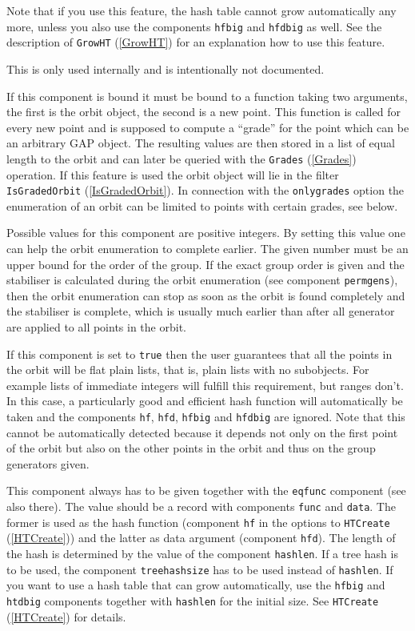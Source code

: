 \documentclass[a4paper,11pt]{report}
\begin{document}
{{{\begin{description}
 Note that if you use this feature, the hash table cannot grow automatically
any more, unless you also use the components \texttt{hfbig} and \texttt{hfdbig} as well. See the description of \texttt{GrowHT} (\ref{GrowHT}) for an explanation how to use this feature. 
\item[{\texttt{genstoapply}}] This is only used internally and is intentionally not documented.
\item[{\texttt{gradingfunc}}] If this component is bound it must be bound to a function taking two
arguments, the first is the orbit object, the second is a new point. This
function is called for every new point and is supposed to compute a ``grade'' for the point which can be an arbitrary \textsf{GAP} object. The resulting values are then stored in a list of equal length to the
orbit and can later be queried with the \texttt{Grades} (\ref{Grades}) operation. If this feature is used the orbit object will lie in the filter \texttt{IsGradedOrbit} (\ref{IsGradedOrbit}). In connection with the \texttt{onlygrades} option the enumeration of an orbit can be limited to points with certain
grades, see below. 
\item[{\texttt{grpsizebound}}] Possible values for this component are positive integers. By setting this
value one can help the orbit enumeration to complete earlier. The given number
must be an upper bound for the order of the group. If the exact group order is
given and the stabiliser is calculated during the orbit enumeration (see
component \texttt{permgens}), then the orbit enumeration can stop as soon as the orbit is found
completely and the stabiliser is complete, which is usually much earlier than
after all generator are applied to all points in the orbit.
\item[{\texttt{forflatplainlists}}]  If this component is set to \texttt{true} then the user guarantees that all the points in the orbit will be flat plain
lists, that is, plain lists with no subobjects. For example lists of immediate
integers will fulfill this requirement, but ranges don't. In this case, a
particularly good and efficient hash function will automatically be taken and
the components \texttt{hf}, \texttt{hfd}, \texttt{hfbig} and \texttt{hfdbig} are ignored. Note that this cannot be automatically detected because it
depends not only on the first point of the orbit but also on the other points
in the orbit and thus on the group generators given. 
\item[{\texttt{hashfunc}}] This component always has to be given together with the \texttt{eqfunc} component (see also there). The value should be a record with components \texttt{func} and \texttt{data}. The former is used as the hash function (component \texttt{hf} in the options to \texttt{HTCreate} (\ref{HTCreate})) and the latter as data argument (component \texttt{hfd}). The length of the hash is determined by the value of the component \texttt{hashlen}. If a tree hash is to be used, the component \texttt{treehashsize} has to be used instead of \texttt{hashlen}. If you want to use a hash table that can grow automatically, use the \texttt{hfbig} and \texttt{htdbig} components together with \texttt{hashlen} for the initial size. See \texttt{HTCreate} (\ref{HTCreate}) for details. 

\end{description}}}}
\end{document}
